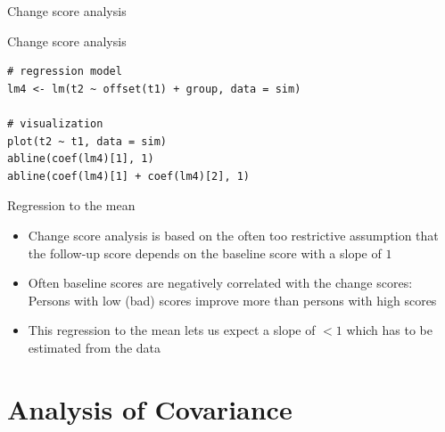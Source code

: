 \documentclass[aspectratio=169]{beamer}
\begin{document}
\begin{frame}{Change score analysis}
\begin{center}
\end{center}
\end{frame}

\begin{frame}[fragile]{Change score analysis}
\begin{lstlisting}
# regression model
lm4 <- lm(t2 ~ offset(t1) + group, data = sim)

# visualization
plot(t2 ~ t1, data = sim)
abline(coef(lm4)[1], 1)
abline(coef(lm4)[1] + coef(lm4)[2], 1)
\end{lstlisting}
\end{frame}

\begin{frame}{Regression to the mean}
\begin{itemize}
  \item Change score analysis is based on the often too restrictive
    assumption that the follow-up score depends on the baseline score with
    a slope of $1$
  \item Often baseline scores are negatively correlated with the change
    scores:\\
    Persons with low (bad) scores improve more than persons with high scores
  \item This regression to the mean lets us expect a slope of $< 1$ which
    has to be estimated from the data
\end{itemize}
\end{frame}

\section[ANCOVA]{Analysis of Covariance}
\end{document}
